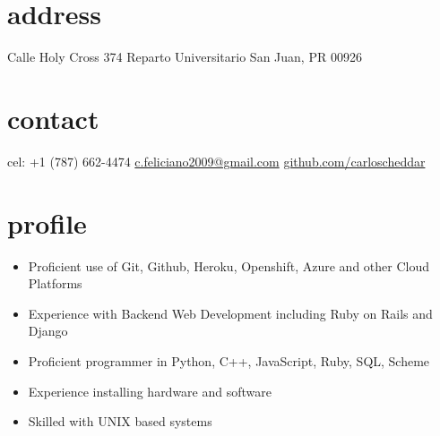\documentclass[]{friggeri-cv} %
\begin{document}


\begin{aside} %
\section{address}\small
Calle Holy Cross 374
Reparto Universitario
San Juan, PR 00926
\section{contact}
\footnotesize cel: +1 (787) 662-4474
\href{mailto:c.feliciano2009@gmail.com}{\footnotesize c.feliciano2009@gmail.com}
\href{https://github.com/carloscheddar}{\footnotesize github.com/carloscheddar}
\end{aside}


\section{profile}

\begin{itemize}\small
\item Proficient use of Git, Github, Heroku, Openshift, Azure and other Cloud
Platforms
\item Experience with Backend Web Development including Ruby on Rails and Django
\item Proficient programmer in Python, C++, JavaScript, Ruby, SQL, Scheme
\item Experience installing hardware and software
\item Skilled with UNIX based systems
\end{itemize}
\end{document}
